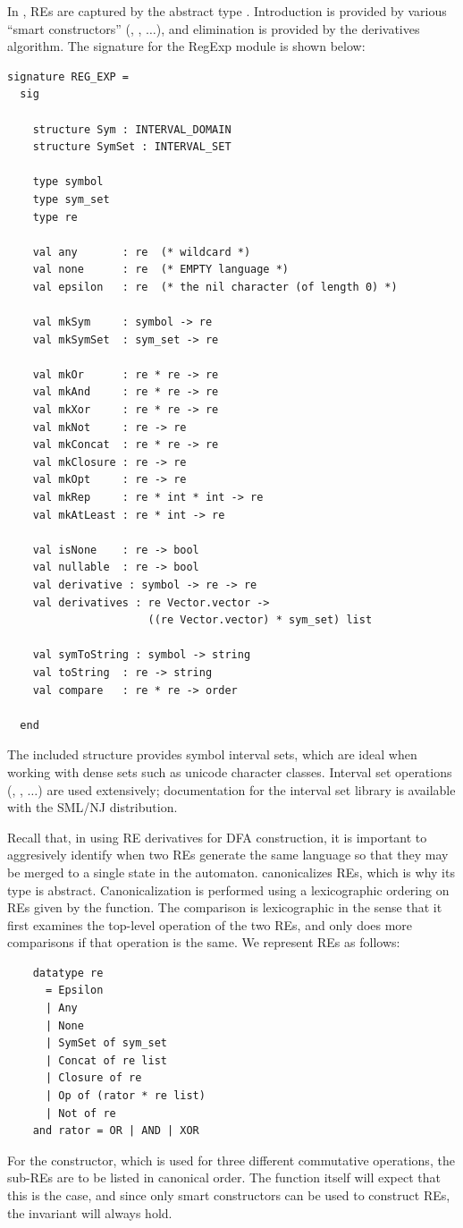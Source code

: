 In \ulex{}, REs are captured by the abstract type .  Introduction
is provided by various ``smart constructors'' (, ,
$\dots$), and elimination is provided by the derivatives algorithm.  The
signature for the \rm{RegExp} module is shown below:

\begin{verbatim}
signature REG_EXP =
  sig

    structure Sym : INTERVAL_DOMAIN
    structure SymSet : INTERVAL_SET

    type symbol
    type sym_set
    type re

    val any       : re  (* wildcard *)
    val none      : re  (* EMPTY language *)
    val epsilon   : re  (* the nil character (of length 0) *)

    val mkSym     : symbol -> re
    val mkSymSet  : sym_set -> re

    val mkOr      : re * re -> re
    val mkAnd     : re * re -> re
    val mkXor     : re * re -> re
    val mkNot     : re -> re
    val mkConcat  : re * re -> re
    val mkClosure : re -> re
    val mkOpt     : re -> re
    val mkRep     : re * int * int -> re
    val mkAtLeast : re * int -> re

    val isNone    : re -> bool
    val nullable  : re -> bool
    val derivative : symbol -> re -> re
    val derivatives : re Vector.vector ->
                      ((re Vector.vector) * sym_set) list

    val symToString : symbol -> string
    val toString  : re -> string
    val compare   : re * re -> order

  end
\end{verbatim}

The included structure  provides symbol interval sets, which are
ideal when working with dense sets such as unicode character classes.  Interval
set operations (, , $\dots$) are used extensively;
documentation for the interval set library is available with the SML/NJ
distribution.

Recall that, in using RE derivatives for DFA construction, it is
important to aggresively identify when two REs generate the same
language so that they may be merged to a single state in the automaton.
 canonicalizes REs, which is why its  type is abstract.
Canonicalization is performed using a lexicographic ordering on REs given by the
 function.  The comparison is lexicographic in the sense that it
first examines the top-level operation of the two REs, and only does more
comparisons if that operation is the same.  We represent REs as follows:
\begin{verbatim}
    datatype re
      = Epsilon
      | Any
      | None
      | SymSet of sym_set
      | Concat of re list
      | Closure of re
      | Op of (rator * re list)
      | Not of re
    and rator = OR | AND | XOR
\end{verbatim}
For the  constructor, which is used for three different commutative
operations, the sub-REs are to be listed in canonical order. The 
function itself will expect that this is the case, and since only smart
constructors can be used to construct REs, the invariant will always hold.

